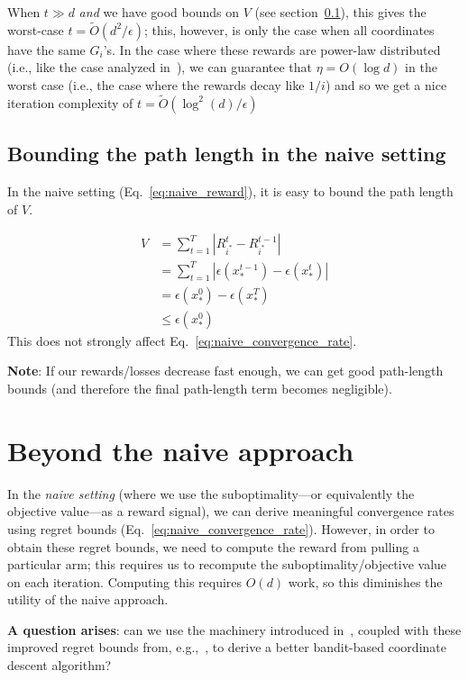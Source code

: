 \documentclass[letterpaper]{article}
\newcommand{\istar}{i^*}
\begin{document}
When $t \gg d$ \emph{and} we have good bounds on $V$ (see section~\ref{section:naive_bounding_path_length}), this gives the worst-case $t = \tilde{O}(d^2/\epsilon)$; this, however, is only the case when all coordinates have the same $G_i$'s. In the case where these rewards are power-law distributed (i.e., like the case analyzed in~\cite{namkoong2017adaptive}), we can guarantee that $\eta = O(\log d)$ in the worst case (i.e., the case where the rewards decay like $1/i$) and so we get a nice iteration complexity of $t = \tilde{O}(\log^2(d) / \epsilon)$

\subsection{Bounding the path length in the naive setting}
\label{section:naive_bounding_path_length}
In the naive setting (Eq.~\ref{eq:naive_reward}), it is easy to bound the path length of $V$. 

\begin{align}
    V &= \sum_{t=1}^T |R_{\istar}^t - R_{\istar}^{t-1}| \\
    &= \sum_{t=1}^T |\epsilon(x^{t-1}_*)-\epsilon(x^t_*)| \\
    &= \epsilon(x^0_*) - \epsilon(x^T_*)\\
    &\leq \epsilon(x^0_*)
\end{align}
This does not strongly affect Eq.~\ref{eq:naive_convergence_rate}.

\textbf{Note}: If our rewards/losses decrease fast enough, we can get good path-length bounds (and therefore the final path-length term becomes negligible).

\section{Beyond the naive approach}
In the \emph{naive setting} (where we use the suboptimality---or equivalently the objective value---as a reward signal), we can derive meaningful convergence rates using regret bounds (Eq.~\ref{eq:naive_convergence_rate}). However, in order to obtain these regret bounds, we need to compute the reward from pulling a particular arm; this requires us to recompute the suboptimality/objective value on each iteration. Computing this requires $O(d)$ work, so this diminishes the utility of the naive approach.

\textbf{A question arises}: can we use the machinery introduced in~\cite{salehi2018coordinate}, coupled with these improved regret bounds from, e.g.,~\cite{bubeck2019improved}, to derive a better bandit-based coordinate descent algorithm? 
\end{document}
